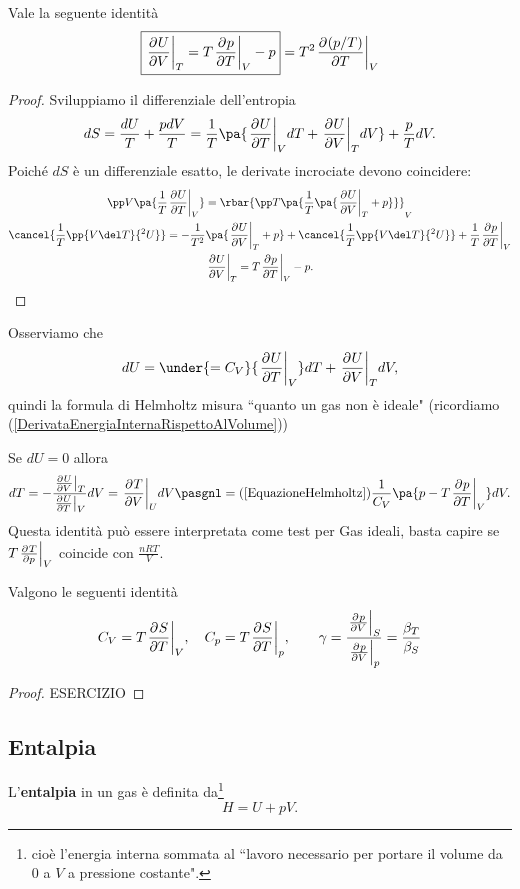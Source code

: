 \begin{proposition}\label{EquazioneHelmholtz}
Vale la seguente identit\`a
\[\boxed{\ppb VUT=T\ppb TpV-p}=T^2\ppb T{(p/T)}V\]
\end{proposition}
\begin{proof}
Sviluppiamo il differenziale dell'entropia
\[dS=\frac{dU}T+\frac{pdV}T=\frac1T\pa{\ppb TUVdT+\ppb VUTdV}+\frac pTdV.\]
Poich\'e $dS$ \`e un differenziale esatto, le derivate incrociate devono coincidere:
\begin{gather*}
\pp V{}\pa{\frac1T\ppb TUV}=\rbar{\pp T{}\pa{\frac1T\pa{\ppb VUT+p}}}_V\\
\cancel{\frac1T\pp{V\del T}{^2U}}=-\frac1{T^2}\pa{\ppb VUT+p}+\cancel{\frac1T\pp{V\del T}{^2U}}+\frac1T\ppb TpV\\
\ppb VUT=T\ppb TpV-p.
\end{gather*}
\end{proof}
\begin{remark}
Osserviamo che 
\[dU=\under{=C_V}{\ppb TUV}dT+\ppb VUTdV,\]
quindi la formula di Helmholtz misura ``quanto un gas non \`e ideale" (ricordiamo (\ref{DerivataEnergiaInternaRispettoAlVolume}))
\end{remark}
\begin{remark}
Se $dU=0$ allora
\[dT=-\frac{\ppb VUT}{\ppb TUV}dV=\ppb VTUdV\pasgnl={(\ref{EquazioneHelmholtz})}\frac1{C_V}\pa{p-T\ppb TpV}dV.\]
Questa identit\`a pu\`o essere interpretata come test per Gas ideali, basta capire se $T\ppb pTV$ coincide con $\frac{nRT}V$.
\end{remark}

\begin{remark}
Valgono le seguenti identit\`a
\[C_V=T\ppb TSV,\quad C_p=T\ppb TSp,\qquad \gamma=\frac{\ppb VpS}{\ppb Vpp}=\frac{\beta_T}{\beta_S}\]
\end{remark}
\begin{proof}
ESERCIZIO
\end{proof}





\subsection{Entalpia}



\begin{definition}[Entalpia]
L'\textbf{entalpia} in un gas \`e definita da\footnote{cio\`e l'energia interna sommata al ``lavoro necessario per portare il volume da $0$ a $V$ a pressione costante".}
\[H=U+pV.\]
\end{definition}

